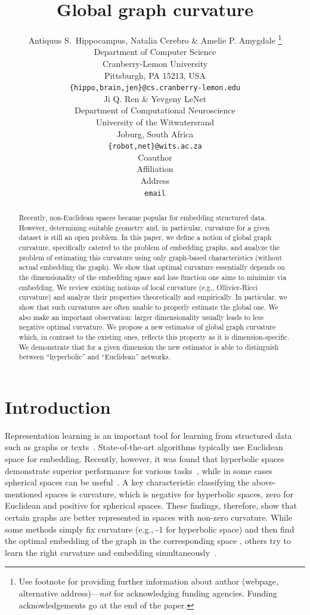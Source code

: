 \documentclass{article} %
\title{Global graph curvature}
\author{Antiquus S.~Hippocampus, Natalia Cerebro \& Amelie P. Amygdale \thanks{ Use footnote for providing further information
about author (webpage, alternative address)---\emph{not} for acknowledging
funding agencies.  Funding acknowledgements go at the end of the paper.} \\
Department of Computer Science\\
Cranberry-Lemon University\\
Pittsburgh, PA 15213, USA \\
\texttt{\{hippo,brain,jen\}@cs.cranberry-lemon.edu} \\
\And
Ji Q. Ren \& Yevgeny LeNet \\
Department of Computational Neuroscience \\
University of the Witwatersrand \\
Joburg, South Africa \\
\texttt{\{robot,net\}@wits.ac.za} \\
\AND
Coauthor \\
Affiliation \\
Address \\
\texttt{email}
}
\begin{document}
\maketitle

\begin{abstract}
Recently, non-Euclidean spaces became popular for embedding structured data. However, determining suitable geometry and, in particular, curvature for a given dataset is still an open problem. 
In this paper, we define a notion of global graph curvature, specifically catered to the problem of embedding graphs, and analyze the problem of estimating this curvature using only graph-based characteristics (without actual embedding the graph).
We show that optimal curvature essentially depends on the dimensionality of the embedding space and loss function one aims to minimize via embedding. We review existing notions of local curvature (e.g., Ollivier-Ricci curvature) and analyze their properties theoretically and empirically. In particular, we show that such curvatures are often unable to properly estimate the global one. We also make an important observation: larger dimensionality usually leads to less negative optimal curvature. We propose a new estimator of global graph curvature which, in contrast to the existing ones, reflects this property as it is dimension-specific. We demonstrate that for a given dimension the new estimator is able to distinguish between ``hyperbolic'' and ``Euclidean'' networks. 

\end{abstract}

\section{Introduction}

Representation learning is an important tool for learning from structured data such as graphs or texts~\citep{grover2016node2vec,perozzi2014deepwalk,mikolov2013distributed}.
State-of-the-art algorithms typically use Euclidean space for embedding. 
Recently, however, it was found that hyperbolic spaces demonstrate superior performance for various tasks~\citep{nickel2018learning,sala2018representation}, while in some cases spherical spaces can be useful~\citep{liu2017sphereface}. A key characteristic classifying the above-mentioned spaces is curvature, which is negative for hyperbolic spaces, zero for Euclidean and positive for spherical spaces. These findings, therefore, show that certain graphs are better represented in spaces with non-zero curvature. While some methods simply fix curvature (e.g., -1 for hyperbolic space) and then find the optimal embedding of the graph in the corresponding space \citep{nickel2018learning}, others try to learn the right curvature and embedding simultaneously~\citep{gu2019learning}.
\end{document}
